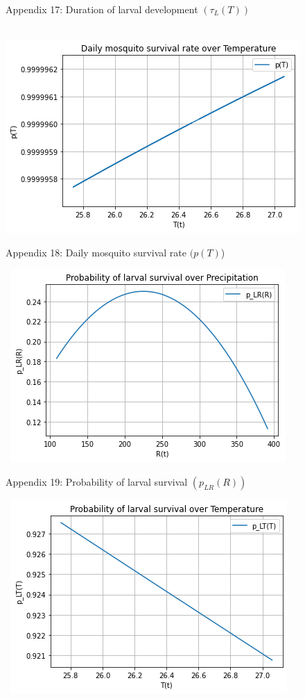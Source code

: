 \documentclass[
	12pt,				%
	oneside,			%
	a4paper,			%
	english,			%
	brazil				%
	]{abntex2}
\begin{document}
\begin{apendicesenv}
\begin{figure}[!ht]
	\caption*{Appendix 17: Duration of larval development $(\tau_L(T))$}
\end{figure} 
\begin{figure}[!ht]
	\centering
	\hbox{\hspace{2.0em} \includegraphics[scale=0.8] {THESIS-Plot_p(T).png}}
	\caption*{Appendix 18: Daily mosquito survival rate $(p(T)$)}
\end{figure}
\newpage
\begin{figure}[!ht]
	\centering
	\hbox{\hspace{4.0em} \includegraphics[scale=0.8] {THESIS-Plot_p_LR(R).png}}
	\caption*{Appendix 19: Probability of larval survival $(p_{LR}(R))$}
\end{figure} 
\begin{figure}[!ht]
	\centering
	\hbox{\hspace{3.5em} \includegraphics[scale=0.8] {THESIS-Plot_p_LT(T).png}}

\end{figure}
\end{apendicesenv}
\end{document}
